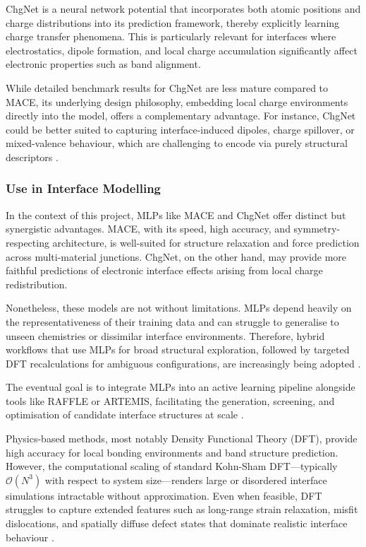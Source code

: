 ChgNet is a neural network potential that incorporates both atomic positions and charge distributions into its prediction framework, thereby explicitly learning charge transfer phenomena. This is particularly relevant for interfaces where electrostatics, dipole formation, and local charge accumulation significantly affect electronic properties such as band alignment.

While detailed benchmark results for ChgNet are less mature compared to MACE, its underlying design philosophy, embedding local charge environments directly into the model, offers a complementary advantage. For instance, ChgNet could be better suited to capturing interface-induced dipoles, charge spillover, or mixed-valence behaviour, which are challenging to encode via purely structural descriptors .

\subsubsection{Use in Interface Modelling}

In the context of this project, MLPs like MACE and ChgNet offer distinct but synergistic advantages. MACE, with its speed, high accuracy, and symmetry-respecting architecture, is well-suited for structure relaxation and force prediction across multi-material junctions. ChgNet, on the other hand, may provide more faithful predictions of electronic interface effects arising from local charge redistribution.

Nonetheless, these models are not without limitations. MLPs depend heavily on the representativeness of their training data and can struggle to generalise to unseen chemistries or dissimilar interface environments. Therefore, hybrid workflows that use MLPs for broad structural exploration, followed by targeted DFT recalculations for ambiguous configurations, are increasingly being adopted .

The eventual goal is to integrate MLPs into an active learning pipeline alongside tools like RAFFLE or ARTEMIS, facilitating the generation, screening, and optimisation of candidate interface structures at scale .

Physics-based methods, most notably Density Functional Theory (DFT), provide high accuracy for local bonding environments and band structure prediction. However, the computational scaling of standard Kohn-Sham DFT---typically $\mathcal{O}(N^3)$ with respect to system size---renders large or disordered interface simulations intractable without approximation. Even when feasible, DFT struggles to capture extended features such as long-range strain relaxation, misfit dislocations, and spatially diffuse defect states that dominate realistic interface behaviour .

